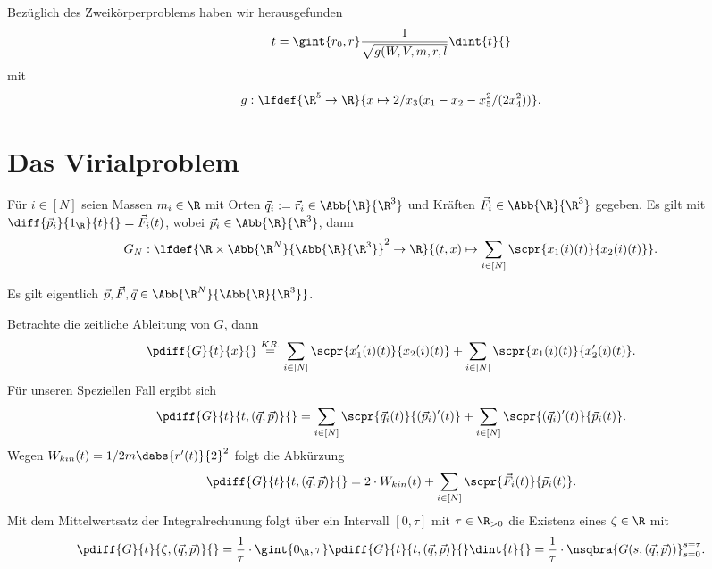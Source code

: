 \documentclass[../WiSe22ANA3.tex]{subfiles}
\begin{document}
		\begin{Erinnerung}
			Bezüglich des Zweikörperproblems haben wir herausgefunden 
			\begin{align*}
				t=\gint{r_0,r}\frac{1}{\sqrt{g(W,V,m,r,l}}\dint{t}{}
			\end{align*}
			mit 
			\begin{align*}
				g:\lfdef{\R^5\to\R}{x\mapsto 2/x_3(x_1-x_2-x_5^2/(2x_4^2))}. 
			\end{align*}
		\end{Erinnerung}
		\section{Das Virialproblem}
			Für $i\in[N]$ seien Massen $m_i\in\R$ mit Orten $\vec q_i:=\vec r_i\in\Abb{\R}{\R^3}$ und Kräften $\vec F_i\in\Abb{\R}{\R^3}$ gegeben. Es gilt mit $\diff{\vec p_i}{1_\R}{t}{}=\vec F_i(t)$, wobei $\vec p_i\in\Abb{\R}{\R^3}$, dann 
			\begin{align*}
				G_N:\lfdef{\R\times\Abb{\R^N}{\Abb{\R}{\R^3}}^2\to\R}{(t,x)\mapsto \sum_{i\in[N]}\scpr{x_1(i)(t)}{x_2(i)(t)}}.
			\end{align*}
			\begin{Erinnerung}
				Es gilt eigentlich $\vec p,\vec F,\vec q\in\Abb{\R^N}{\Abb{\R}{\R^3}}$.
			\end{Erinnerung}
			Betrachte die zeitliche Ableitung von $G$, dann 
			\begin{align*}
				\pdiff{G}{t}{x}{}\stackrel{KR.}{=}\sum_{i\in[N]}\scpr{x'_1(i)(t)}{x_2(i)(t)}+\sum_{i\in[N]}\scpr{x_1(i)(t)}{x'_2(i)(t)}. 
			\end{align*}
			Für unseren Speziellen Fall ergibt sich 
			\begin{align*}
				\pdiff{G}{t}{t,(\vec q,\vec p)}{}=\sum_{i\in[N]}\scpr{\vec q_i(t)}{(\vec p_i)'(t)}+\sum_{i\in[N]}\scpr{(\vec q_i)'(t)}{\vec p_i(t)}.
			\end{align*}
			Wegen $W_{kin}(t)=1/2m\dabs{r'(t)}{2}^2$ folgt die Abkürzung
			\begin{align*}
				\pdiff{G}{t}{t,(\vec q,\vec p)}{}=2\cdot W_{kin}(t)+\sum_{i\in[N]}\scpr{\vec F_i(t)}{\vec p_i(t)}.
			\end{align*}
			Mit dem Mittelwertsatz der Integralrechunung folgt über ein Intervall $[0,\tau]$ mit $\tau\in\R_{>0}$ die Existenz eines $\zeta\in\R$ mit
			\begin{align*}
				\pdiff{G}{t}{\zeta,(\vec q,\vec p)}{}=\frac{1}{\tau}\cdot\gint{0_\R,\tau}\pdiff{G}{t}{t,(\vec q,\vec p)}{}\dint{t}{}=\frac{1}{\tau}\cdot\nsqbra{G(s,(\vec q,\vec p))}_{s=0}^{s=\tau}.
			\end{align*}
\end{document}
